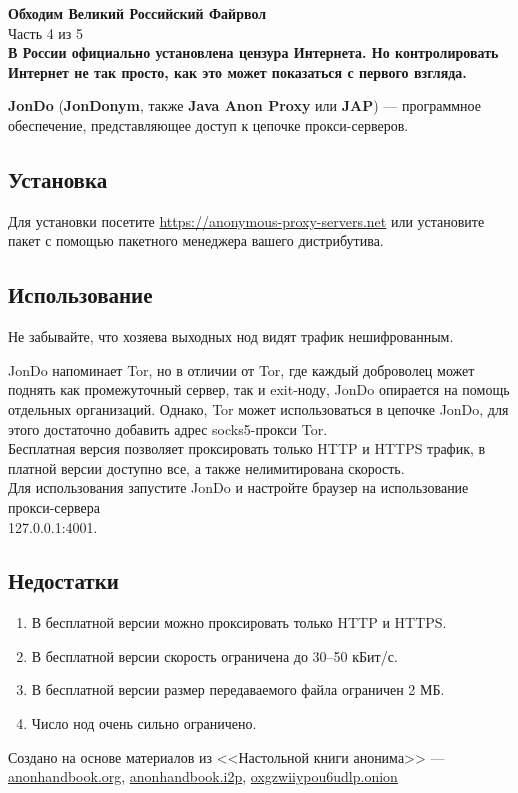 \begin{center}
\LARGE \textbf{Обходим Великий Российский Файрвол}\\
\large Часть 4 из 5\\
\normalsize\textbf{В России официально установлена цензура Интернета. Но контролировать Интернет не так просто, как это может показаться с первого взгляда.}
\end{center}
\textbf{JonDo} (\textbf{JonDonym}, также \textbf{Java Anon Proxy} или \textbf{JAP}) --- программное обеспечение, представляющее доступ к цепочке прокси-серверов.
\subsection*{Установка}
Для установки посетите \url{https://anonymous-proxy-servers.net} или установите пакет с помощью пакетного менеджера вашего дистрибутива.
\subsection*{Использование}
\begin{important}
Не забывайте, что хозяева выходных нод видят трафик нешифрованным.
\end{important}
JonDo напоминает Tor, но в отличии от Tor, где каждый доброволец может поднять как промежуточный сервер, так и exit-ноду, JonDo опирается на помощь отдельных организаций. Однако, Tor может использоваться в цепочке JonDo, для этого достаточно добавить адрес socks5-прокси Tor.\\
Бесплатная версия позволяет проксировать только HTTP и HTTPS трафик, в платной версии доступно все, а также нелимитирована скорость.\\
Для использования запустите JonDo и настройте браузер на использование прокси-сервера\\127.0.0.1:4001.
\subsection*{Недостатки}
\begin{enumerate}
\item В бесплатной версии можно проксировать только HTTP и HTTPS.
\item В бесплатной версии скорость ограничена до 30--50 кБит/с.
\item В бесплатной версии размер передаваемого файла ограничен 2 МБ.
\item Число нод очень сильно ограничено.
\end{enumerate}

\vfill
\scriptsize Создано на основе материалов из <<Настольной книги анонима>> --- \url{anonhandbook.org}, \url{anonhandbook.i2p}, \url{oxgzwiiypou6udlp.onion}
\normalsize
